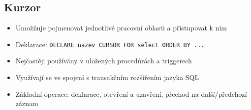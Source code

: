 \documentclass[a4paper,10pt]{article}
\begin{document}
		\subsection{Kurzor}
			\begin{itemize}
				\item Umožňuje pojmenovat jednotlivé pracovní oblasti a přistupovat k nim
				\item Deklarace: \texttt{DECLARE nazev CURSOR FOR select ORDER BY ...}
				\item Nejčastěji používány v uložených procedůrách a triggerech
				\item Využívají se ve spojení s transakčním rozšířením jazyka SQL
				\item Základní operace: deklarace, otevření a uzavření, přechod na další/předchozí záznam
			\end{itemize}
\end{document}
